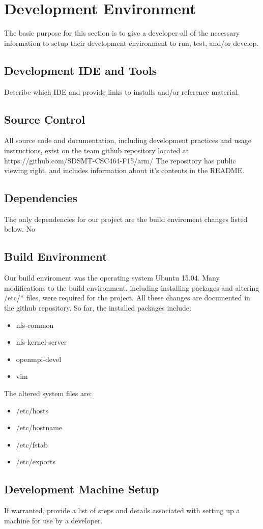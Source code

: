 \chapter{Development Environment}
The basic purpose for this section is to give a developer all of the necessary 
information to setup their development environment to run, test, and/or develop.




\section{Development IDE and Tools}
Describe which IDE and provide links to installs and/or reference material. 

\section{Source  Control}
All source code and documentation, including development practices and usage instructions, exist
on the team github repository located at 
https://github.com/SDSMT-CSC464-F15/arm/
The repository has public viewing right, and includes information about it's contents in the README.


\section{Dependencies}
The only dependencies for our project are the build enviroment changes listed below. No   

\section{Build  Environment}
Our build enviroment was the operating system Ubuntu 15.04. Many modifications to the build environment,
including installing packages and altering /etc/* files, were required for the project. All these changes
are documented in the github repository. So far, the installed packages include:
\begin{itemize}
	\item nfs-common
	\item nfs-kernel-server
	\item openmpi-devel
	\item vim
\end{itemize}
The altered system files are:
\begin{itemize}
	\item /etc/hosts
	\item /etc/hostname
	\item /etc/fstab
	\item /etc/exports
\end{itemize}

\section{Development Machine Setup}
If warranted, provide a list of steps and details associated with setting up a 
machine for use by a developer. 


